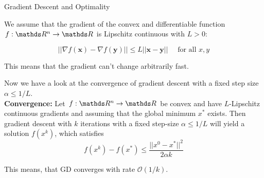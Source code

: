 \documentclass[11pt,compress,t,notes=noshow, xcolor=table]{beamer}
\begin{document}
\begin{vbframe}{Gradient Descent and Optimality}
\begin{minipage}{0.5\textwidth}
\begin{figure}
			\end{figure}
		\end{minipage}  
		\framebreak
		
			We assume that the gradient of the convex and differentiable function $f: \R^n \rightarrow \R$ is Lipschitz continuous with $L > 0$: 
		
			\begin{equation*}
			|| \nabla f(\bm{x}) - \nabla f(\bm{y}) || \le L ||\bm{x} - \bm{y} || \quad \text{ for all } x, y
			\end{equation*}
			
			This means that the gradient can't change arbitrarily fast. 
			
			\lz 
			
			Now we have a look at the convergence of gradient descent with a fixed step size $\alpha \leq 1/L$. \\
			\textbf{Convergence:} Let $f:\R^n \to \R$ be convex and have $L$-Lipschitz continuous gradients and assuming that the global minimum ${x}^\ast$ exists. Then gradient descent with $k$ iterations with a fixed step-size $\alpha \leq 1/L$ will yield a solution $f(x^k)$, which satisfies
			$$
				f({x}^k) - f({x}^\ast) \leq \frac{|| {x}^0 - {x}^\ast ||^2}{2\alpha k}
			$$
			
			This means, that GD converges with rate $\mathcal{O}(1/k)$.
			\framebreak 
		\end{vbframe}
\end{document}
